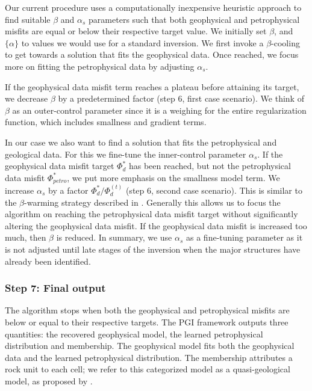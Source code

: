 \documentclass[extra]{gji} %
\begin{document}
Our current procedure uses a computationally inexpensive heuristic approach to find suitable $\beta$ and $\alpha_s$ parameters such that both geophysical and petrophysical misfits are equal or below their respective target value. We initially set $\beta$, and $\{\alpha\}$ to values we would use for a standard inversion. We first invoke a $\beta$-cooling to get towards a solution that fits the geophysical data. Once reached, we focus more on fitting the petrophysical data by adjusting $\alpha_s$.

If the geophysical data misfit term reaches a plateau before attaining its target, we decrease $\beta$ by a predetermined factor (step $6$, first case scenario). We think of $\beta$ as an outer-control parameter since it is a weighing for the entire regularization function, which includes smallness and gradient terms.

In our case we also want to find a solution that fits the petrophysical and geological data. For this we fine-tune the inner-control parameter $\alpha_s$. If the geophysical data misfit target $\Phi_d^*$ has been reached, but not the petrophysical data misfit $\Phi_{petro}^*$, we put more emphasis on the smallness model term. We increase $\alpha_s$ by a factor $\Phi_d^*/\Phi_d^{(t)}$ (step $6$, second case scenario). This is similar to the $\beta$-warming strategy described in \cite{Fournier2015}. Generally this allows us to focus the algorithm on reaching the petrophysical data misfit target without significantly altering the geophysical data misfit. If the geophysical data misfit is increased too much, then $\beta$ is reduced. In summary, we use $\alpha_s$ as a fine-tuning parameter as it is not adjusted until late stages of the inversion when the major structures have already been identified.

\subsubsection{Step 7: Final output}

The algorithm stops when both the geophysical and petrophysical misfits are below or equal to their respective targets. The PGI framework outputs three quantities: the recovered geophysical model, the learned petrophysical distribution and membership. The geophysical model fits both the geophysical data and the learned petrophysical distribution. The membership attributes a rock unit to each cell; we refer to this categorized model as a quasi-geological model, as proposed by \cite{QuasiGeologicalModel}.
\end{document}
